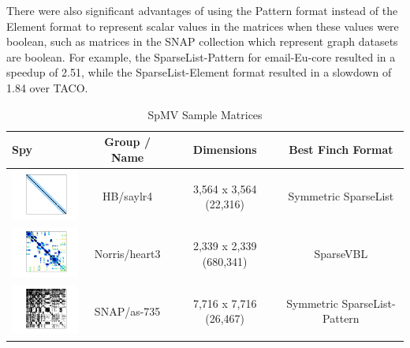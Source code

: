 There were also significant advantages of using the Pattern format instead of the Element format to represent scalar values in the matrices when these values were boolean, such as matrices in the SNAP collection which represent graph datasets are boolean. For example, the SparseList-Pattern for email-Eu-core resulted in a speedup of 2.51, while the SparseList-Element format resulted in a slowdown of 1.84 over TACO.

\begin{table}[htbp]
    \centering
    \caption{SpMV Sample Matrices}
    \label{spmv_sample_matrices}
    \begin{tabular}{|m{3cm}|c|c|c|}
        \hline
        \textbf{Spy} & \textbf{Group / Name} & \textbf{Dimensions} & \textbf{Best Finch Format}\\
        \hline
        \includegraphics[width=3cm]{spmv_matrices/saylr4.png} & HB/saylr4 & 3,564 x 3,564 (22,316) & Symmetric SparseList \\
        \hline 
        \includegraphics[width=3cm]{spmv_matrices/heart3.png} & Norris/heart3 & 2,339 x 2,339 (680,341) & SparseVBL \\
        \hline 
        \includegraphics[width=3cm]{spmv_matrices/as-735.png} & SNAP/as-735 & 7,716 x 7,716 (26,467) & Symmetric SparseList-Pattern \\
        \hline
    \end{tabular}
\end{table}

